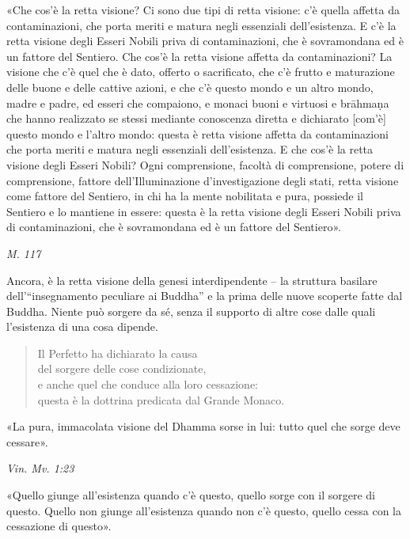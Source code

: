 «Che cos’è la retta visione? Ci sono due tipi di retta visione: c’è
quella affetta da contaminazioni, che porta meriti e matura negli
essenziali dell’esistenza. E c’è la retta visione degli Esseri Nobili
priva di contaminazioni, che è sovramondana ed è un fattore del
Sentiero. Che cos’è la retta visione affetta da contaminazioni? La
visione che c’è quel che è dato, offerto o sacrificato, che c’è frutto e
maturazione delle buone e delle cattive azioni, e che c’è questo mondo e
un altro mondo, madre e padre, ed esseri che compaiono, e monaci buoni e
virtuosi e brāhmaṇa che hanno realizzato se stessi mediante conoscenza
diretta e dichiarato [com’è] questo mondo e l’altro mondo: questa è
retta visione affetta da contaminazioni che porta meriti e matura negli
essenziali dell’esistenza. E che cos’è la retta visione degli Esseri
Nobili? Ogni comprensione, facoltà di comprensione, potere di
comprensione, fattore dell’Illuminazione d’investigazione degli stati,
retta visione come fattore del Sentiero, in chi ha la mente nobilitata e
pura, possiede il Sentiero e lo mantiene in essere: questa è la retta
visione degli Esseri Nobili priva di contaminazioni, che è sovramondana
ed è un fattore del Sentiero».


\emph{M. 117}


 Ancora, è la retta visione della genesi
interdipendente – la struttura basilare dell’“insegnamento peculiare ai
Buddha” e la prima delle nuove scoperte fatte dal Buddha. Niente può
sorgere da sé, senza il supporto di altre cose dalle quali l’esistenza
di una cosa dipende.




\begin{quote}
Il Perfetto ha dichiarato la causa \\
del sorgere delle cose condizionate, \\
e anche quel che conduce alla loro cessazione: \\
questa è la dottrina predicata dal Grande Monaco.
\end{quote}

«La pura, immacolata visione del Dhamma sorse in lui: tutto quel che
sorge deve cessare».


\emph{Vin. Mv. 1:23}


 «Quello giunge all’esistenza quando c’è questo, quello sorge
con il sorgere di questo. Quello non giunge all’esistenza quando non c’è
questo, quello cessa con la cessazione di questo».


